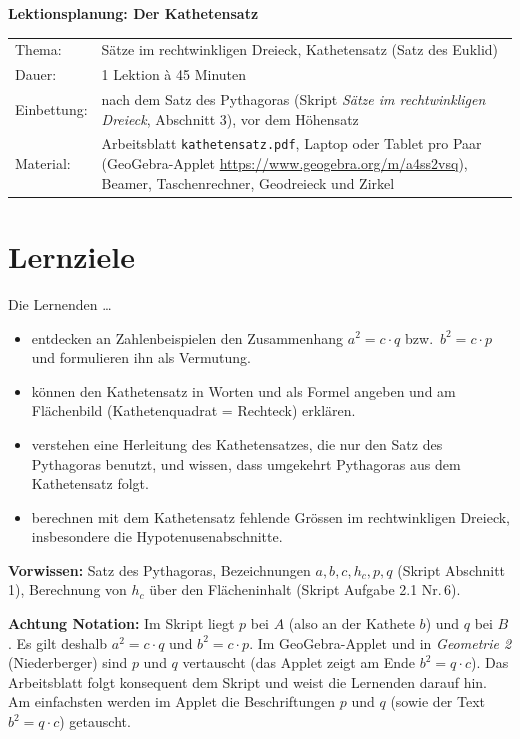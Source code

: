 \documentclass[11pt,oneside]{article}
\begin{document}
{\Large\textbf{Lektionsplanung: Der Kathetensatz}}\\[2mm]
\begin{tabularx}{\textwidth}{@{}lX}
	Thema: & Sätze im rechtwinkligen Dreieck, Kathetensatz (Satz des Euklid)\\
	Dauer: & 1 Lektion à 45 Minuten\\
	Einbettung: & nach dem Satz des Pythagoras (Skript \textit{Sätze im rechtwinkligen Dreieck}, Abschnitt 3), vor dem Höhensatz\\
	Material: & Arbeitsblatt \texttt{kathetensatz.pdf}, Laptop oder Tablet pro Paar (GeoGebra-Applet \url{https://www.geogebra.org/m/a4ss2vsq}), Beamer, Taschenrechner, Geodreieck und Zirkel\\
\end{tabularx}

\section*{Lernziele}
Die Lernenden \ldots
\begin{itemize}[itemsep=0pt]
	\item entdecken an Zahlenbeispielen den Zusammenhang $a^2=c\cdot q$ bzw.\ $b^2=c\cdot p$ und formulieren ihn als Vermutung.
	\item können den Kathetensatz in Worten und als Formel angeben und am Flächenbild (Kathetenquadrat = Rechteck) erklären.
	\item verstehen eine Herleitung des Kathetensatzes, die nur den Satz des Pythagoras benutzt, und wissen, dass umgekehrt Pythagoras aus dem Kathetensatz folgt.
	\item berechnen mit dem Kathetensatz fehlende Grössen im rechtwinkligen Dreieck, insbesondere die Hypotenusenabschnitte.
\end{itemize}

\textbf{Vorwissen:} Satz des Pythagoras, Bezeichnungen $a,b,c,h_c,p,q$ (Skript Abschnitt 1), Berechnung von $h_c$ über den Flächeninhalt (Skript Aufgabe 2.1 Nr.\,6).

\textbf{Achtung Notation:} Im Skript liegt $p$ bei $A$ (also an der Kathete $b$) und $q$ bei $B$. Es gilt deshalb $a^2=c\cdot q$ und $b^2=c\cdot p$. Im GeoGebra-Applet und in \textit{Geometrie 2} (Niederberger) sind $p$ und $q$ vertauscht (das Applet zeigt am Ende $b^2=q\cdot c$). Das Arbeitsblatt folgt konsequent dem Skript und weist die Lernenden darauf hin. Am einfachsten werden im Applet die Beschriftungen $p$ und $q$ (sowie der Text $b^2=q\cdot c$) getauscht.
\end{document}
